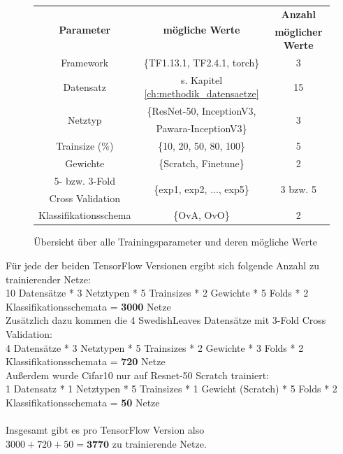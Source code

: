 \begin{figure}[H]
\begin{tabular}{|c|c|c|}
\hline 
\multirow{2}{*}{\textbf{Parameter}} & \multirow{2}{*}{\textbf{mögliche Werte}} & \textbf{Anzahl} \\ 
& & \textbf{möglicher Werte} \\
\hline 
Framework & \{TF1.13.1, TF2.4.1, torch\} & 3\\
\hline
Datensatz & s. Kapitel \ref{ch:methodik_datensaetze} & 15\\
\hline 
\multirow{2}{*}{Netztyp} & \{ResNet-50, InceptionV3, & \multirow{2}{*}{3} \\
 & Pawara-InceptionV3\} & \\
\hline
Trainsize (\%) & \{10, 20, 50, 80, 100\}& 5 \\
\hline
Gewichte & \{Scratch, Finetune\} & 2 \\
\hline
5- bzw. 3-Fold & \multirow{2}{*}{\{exp1, exp2, ..., exp5\}} & \multirow{2}{*}{3 bzw. 5} \\
Cross Validation & & \\
\hline
Klassifikationsschema & \{OvA, OvO\} & 2 \\
\hline
\end{tabular} 
\caption{Übersicht über alle Trainingsparameter und deren mögliche Werte}
\label{tab:parameterUebersicht}
\end{figure}

Für jede der beiden TensorFlow \cite{tensorflow} Versionen ergibt sich folgende Anzahl zu trainierender Netze:\\
\begin{adjustbox}{width=\textwidth, center}
10 Datensätze * 3 Netztypen * 5 Trainsizes * 2 Gewichte * 5 Folds * 2 Klassifikationsschemata = \textbf{3000} Netze\\
\end{adjustbox}
Zusätzlich dazu kommen die 4 SwedishLeaves \cite{swedishLeaves} Datensätze mit 3-Fold Cross Validation:\\
\begin{adjustbox}{width=\textwidth, center}
4 Datensätze * 3 Netztypen * 5 Trainsizes * 2 Gewichte * 3 Folds * 2 Klassifikationsschemata = \textbf{720} Netze\\
\end{adjustbox}
Außerdem wurde Cifar10 \cite{cifar10} nur auf Resnet-50 Scratch trainiert:\\
\begin{adjustbox}{width=\textwidth, center}
1 Datensatz * 1 Netztypen * 5 Trainsizes * 1 Gewicht (Scratch) * 5 Folds * 2 Klassifikationsschemata = \textbf{50} Netze\\
\end{adjustbox}
\\
Insgesamt gibt es pro TensorFlow \cite{tensorflow} Version also\\
$3000 + 720 + 50 = \textbf{3770}$ zu trainierende Netze.\\\\

